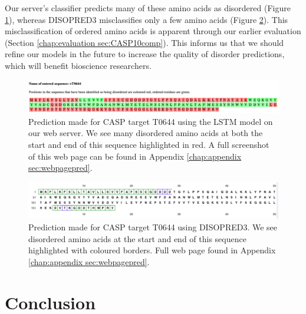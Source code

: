 \documentclass{l4proj}
\begin{document}
Our server’s classifier predicts many of these amino acids as disordered (Figure \ref{fig:mypredclipped}), whereas DISOPRED3 misclassifies only a few amino acids (Figure \ref{fig:disopredclipped}). This misclassification of ordered amino acids is apparent through our earlier evaluation (Section \ref{chap:evaluation sec:CASP10comp}). This informs us that we should refine our models in the future to increase the quality of disorder predictions, which will benefit bioscience researchers.

\begin{figure}[!htb]
    \centering
    \includegraphics[width=\linewidth]{images/web_eval/mypred-clipped.pdf}
    
    \caption{Prediction made for CASP target T0644 using the LSTM model on our web server. We see many disordered amino acids at both the start and end of this sequence highlighted in red. A full screenshot of this web page can be found in Appendix \ref{chap:appendix sec:webpagepred}.}
    
    \label{fig:mypredclipped}
\end{figure}

\begin{figure}[!htb]
    \centering
    \includegraphics[width=\linewidth]{images/web_eval/disopred-clipped.pdf}
    
    \caption{Prediction made for CASP target T0644 using DISOPRED3. We see disordered amino acids at the start and end of this sequence highlighted with coloured borders. Full web page found in Appendix \ref{chap:appendix sec:webpagepred}.}
    
    \label{fig:disopredclipped}
\end{figure}

\chapter{Conclusion}    
\end{document}
